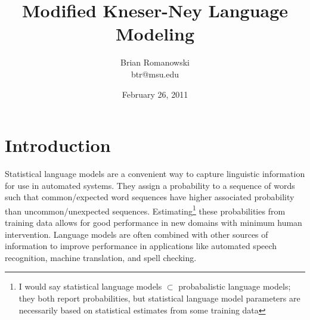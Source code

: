 \documentclass[10pt]{article}
\begin{document}
\title{Modified Kneser-Ney Language Modeling}

\author{Brian Romanowski\\
btr@msu.edu} 
\date{February 26, 2011}

\maketitle






\section{Introduction}
Statistical language models are a convenient way to capture linguistic information for use in automated systems.
They assign a probability to a sequence of words such that common/expected word sequences have higher associated probability than uncommon/unexpected sequences.
Estimating\footnote{I would say statistical language models $\subset$ probabalistic language models; they both report probabilities, but statistical language model parameters are necessarily based on statistical estimates from some training data} these probabilities from training data allows for good performance in new domains with minimum human intervention.
Language models are often combined with other sources of information to improve performance in applications like automated speech recognition, machine translation, and spell checking.
\end{document}
